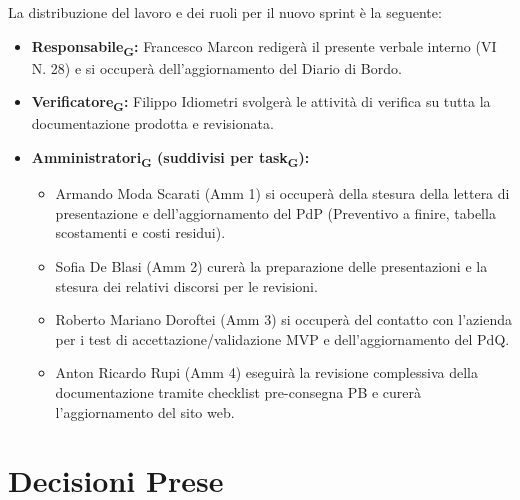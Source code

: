 \vspace{0.3cm}

La distribuzione del lavoro e dei ruoli per il nuovo sprint è la seguente:

\begin{itemize}

\item \textbf{Responsabile\textsubscript{G}:} Francesco Marcon redigerà il presente verbale interno (VI N. 28) e si occuperà dell'aggiornamento del Diario di Bordo.

\item \textbf{Verificatore\textsubscript{G}:} Filippo Idiometri svolgerà le attività di verifica su tutta la documentazione prodotta e revisionata.

\item \textbf{Amministratori\textsubscript{G} (suddivisi per task\textsubscript{G}):}
\begin{itemize}

\item Armando Moda Scarati (Amm 1) si occuperà della stesura della lettera di presentazione e dell'aggiornamento del PdP (Preventivo a finire, tabella scostamenti e costi residui).

\item Sofia De Blasi (Amm 2) curerà la preparazione delle presentazioni e la stesura dei relativi discorsi per le revisioni.

\item Roberto Mariano Doroftei (Amm 3) si occuperà del contatto con l'azienda per i test di accettazione/validazione MVP e dell'aggiornamento del PdQ.

\item Anton Ricardo Rupi (Amm 4) eseguirà la revisione complessiva della documentazione tramite checklist pre-consegna PB e curerà l'aggiornamento del sito web.

\end{itemize}

\end{itemize}



\section{Decisioni Prese}


\renewcommand{\arraystretch}{1.3}

\vspace{-0.3cm}

